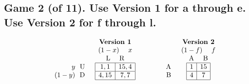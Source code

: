 \documentclass[11pt]{article}
\begin{document}
\subsection*{Game 2 (of 11). Use Version 1 for a through e. Use Version 2 for f through l.
}
$$
\begin{array}{lcr}
\begin{array}{lccc}
    & & & \textbf{Version 1} \\
    & & & (1-x) \ \ \ \ x\\
    & & & \text{L} \ \ \ \ \text{R}\\
    & &
    \begin{array}{r}
        y \ \ \text{U} \\
        (1-y) \ \ \text{D} \\
    \end{array} &
    \begin{array}{|c|c|}
        \hline
        1,1 & 15,4 \\
        \hline
        4,15 & 7,7 \\
        \hline
    \end{array}
\end{array}
&
\begin{array}{lccc}
    & & & \textbf{Version 2} \\
    & & & (1-f) \ \ \ \ f\\
    & & & \text{A} \ \ \ \ \text{B}\\
    & &
    \begin{array}{r}
        \text{A} \\
        \text{B} \\
    \end{array} &
    \begin{array}{|c|c|}
        \hline
        1 & 15 \\
        \hline
        4 & 7 \\
        \hline
    \end{array}
\end{array}
\end{array}
$$
\end{document}
